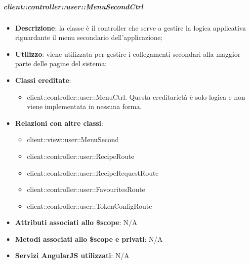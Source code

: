 		\subparagraph{client::controller::user::MenuSecondCtrl} %
		\label{subp:client_controller_user_menusecondctrl}

			\begin{itemize}
				\item \textbf{Descrizione}: la classe è il controller che serve a gestire la logica applicativa riguardante il menu secondario dell'applicazione;
				\item \textbf{Utilizzo}: viene utilizzata per gestire i collegamenti secondari alla maggior parte delle pagine del sistema;
				\item \textbf{Classi ereditate}:
					\begin{itemize}
						\item client::controller::user::MenuCtrl. Questa ereditarietà è solo logica e non viene implementata in nessuna forma.
					\end{itemize}
				\item \textbf{Relazioni con altre classi}:
					\begin{itemize}
						\item client::view::user::MenuSecond
						\item client::controller::user::RecipeRoute
						\item client::controller::user::RecipeRequestRoute
						\item client::controller::user::FavouritesRoute
						\item client::controller::user::TokenConfigRoute
					\end{itemize}
				\item \textbf{Attributi associati allo \$scope}: N/A
				\item \textbf{Metodi associati allo \$scope e privati}: N/A
				\item \textbf{Servizi AngularJS utilizzati}: N/A
			\end{itemize}


